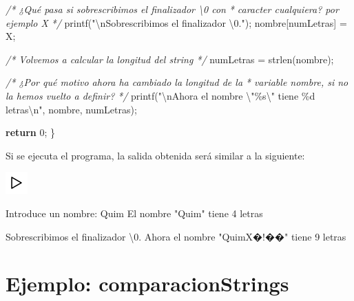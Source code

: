 \documentclass[
]{book}
\newenvironment{Shaded}{\begin{snugshade}}{\end{snugshade}}
\newcommand{\CharTok}[1]{\textcolor[rgb]{0.31,0.60,0.02}{#1}}
\newcommand{\CommentTok}[1]{\textcolor[rgb]{0.56,0.35,0.01}{\textit{#1}}}
\newcommand{\ControlFlowTok}[1]{\textcolor[rgb]{0.13,0.29,0.53}{\textbf{#1}}}
\newcommand{\DecValTok}[1]{\textcolor[rgb]{0.00,0.00,0.81}{#1}}
\newcommand{\NormalTok}[1]{#1}
\newcommand{\SpecialCharTok}[1]{\textcolor[rgb]{0.00,0.00,0.00}{#1}}
\newcommand{\StringTok}[1]{\textcolor[rgb]{0.31,0.60,0.02}{#1}}
\begin{document}
\begin{Shaded}
\begin{Highlighting}[]
    \CommentTok{/* ¿Qué pasa si sobrescribimos el finalizador \textquotesingle{}\textbackslash{}0\textquotesingle{} con}
\CommentTok{     * caracter cualquiera? por ejemplo \textquotesingle{}X\textquotesingle{}}
\CommentTok{     */}
\NormalTok{    printf(}\StringTok{"}\SpecialCharTok{\textbackslash{}n}\StringTok{Sobrescribimos el finalizador \textquotesingle{}}\SpecialCharTok{\textbackslash{}0}\StringTok{\textquotesingle{}."}\NormalTok{);}
\NormalTok{    nombre[numLetras] = }\CharTok{\textquotesingle{}X\textquotesingle{}}\NormalTok{;}

    \CommentTok{/* Volvemos a calcular la longitud del string */}
\NormalTok{    numLetras = strlen(nombre);}

    \CommentTok{/* ¿Por qué motivo ahora ha cambiado la longitud de la}
\CommentTok{     * variable nombre, si no la hemos vuelto a definir?}
\CommentTok{     */}
\NormalTok{    printf(}\StringTok{"}\SpecialCharTok{\textbackslash{}n}\StringTok{Ahora el nombre }\SpecialCharTok{\textbackslash{}"}\StringTok{\%s}\SpecialCharTok{\textbackslash{}"}\StringTok{ tiene \%d letras}\SpecialCharTok{\textbackslash{}n}\StringTok{"}\NormalTok{, nombre, numLetras);}

    \ControlFlowTok{return} \DecValTok{0}\NormalTok{;}
\NormalTok{\}}
\end{Highlighting}
\end{Shaded}

Si se ejecuta el programa, la salida obtenida será similar a la siguiente:

\includegraphics{./img/play.png}

\begin{Shaded}
\begin{Highlighting}[]
\NormalTok{Introduce un nombre: Quim}
\NormalTok{El nombre }\StringTok{"Quim"}\NormalTok{ tiene }\DecValTok{4}\NormalTok{ letras}

\NormalTok{Sobrescribimos el finalizador }\CharTok{\textquotesingle{}\textbackslash{}0\textquotesingle{}}\NormalTok{.}
\NormalTok{Ahora el nombre }\StringTok{"QuimX�!��"}\NormalTok{ tiene }\DecValTok{9}\NormalTok{ letras}
\end{Highlighting}
\end{Shaded}

\hypertarget{ejemplo-comparacionstrings}{%
\section{Ejemplo: comparacionStrings}\label{ejemplo-comparacionstrings}}
\end{document}
